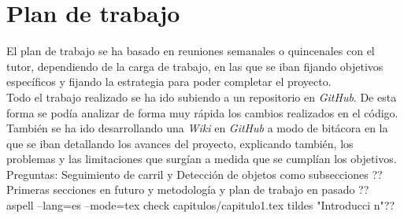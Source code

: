 \section{Plan de trabajo}
\label{sec:plantrabajo}

El plan de trabajo se ha basado en reuniones semanales o quincenales con el tutor, dependiendo de la carga de trabajo, en las que se iban fijando objetivos específicos y fijando la estrategia para poder completar el proyecto.\\

Todo el trabajo realizado se ha ido subiendo a un repositorio en \textit{GitHub}. De esta forma se podía analizar de forma muy rápida los cambios realizados en el código. También se ha ido desarrollando una \textit{Wiki} en \textit{GitHub} a modo de bitácora en la que se iban detallando los avances del proyecto, explicando también, los problemas y las limitaciones que surgían a medida que se cumplían los objetivos. \\


Preguntas: Seguimiento de carril y Detección de objetos como subsecciones ??\\
Primeras secciones en futuro y metodología y plan de trabajo en pasado ??\\
aspell --lang=es --mode=tex check capitulos/capitulo1.tex tildes "Introducci  n"??\\
